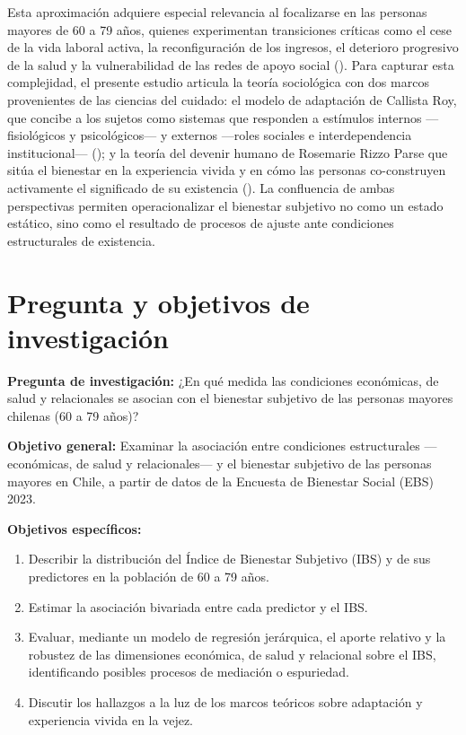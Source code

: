 \documentclass[
  spanish,
  a4paper,
  oneside]{scrbook}
\providecommand{\tightlist}{%
  \setlength{\itemsep}{0pt}\setlength{\parskip}{0pt}}
\begin{document}
Esta aproximación adquiere especial relevancia al focalizarse en las
personas mayores de 60 a 79 años, quienes experimentan transiciones
críticas como el cese de la vida laboral activa, la reconfiguración de
los ingresos, el deterioro progresivo de la salud y la vulnerabilidad de
las redes de apoyo social (). Para capturar esta complejidad, el presente estudio articula la
teoría sociológica con dos marcos provenientes de las ciencias del
cuidado: el modelo de adaptación de Callista Roy, que concibe a los
sujetos como sistemas que responden a estímulos internos ---fisiológicos
y psicológicos--- y externos ---roles sociales e interdependencia
institucional--- (); y
la teoría del devenir humano de Rosemarie Rizzo Parse que sitúa el
bienestar en la experiencia vivida y en cómo las personas co-construyen
activamente el significado de su existencia
(). La
confluencia de ambas perspectivas permiten operacionalizar el bienestar
subjetivo no como un estado estático, sino como el resultado de procesos
de ajuste ante condiciones estructurales de existencia.

\section{Pregunta y objetivos de
investigación}\label{pregunta-y-objetivos-de-investigaciuxf3n}

\textbf{Pregunta de investigación:} ¿En qué medida las condiciones
económicas, de salud y relacionales se asocian con el bienestar
subjetivo de las personas mayores chilenas (60 a 79 años)?

\textbf{Objetivo general:} Examinar la asociación entre condiciones
estructurales ---económicas, de salud y relacionales--- y el bienestar
subjetivo de las personas mayores en Chile, a partir de datos de la
Encuesta de Bienestar Social (EBS) 2023.

\textbf{Objetivos específicos:}

\begin{enumerate}
\def\labelenumi{\arabic{enumi}.}
\tightlist
\item
  Describir la distribución del Índice de Bienestar Subjetivo (IBS) y de
  sus predictores en la población de 60 a 79 años.
\item
  Estimar la asociación bivariada entre cada predictor y el IBS.
\item
  Evaluar, mediante un modelo de regresión jerárquica, el aporte
  relativo y la robustez de las dimensiones económica, de salud y
  relacional sobre el IBS, identificando posibles procesos de mediación
  o espuriedad.
\item
  Discutir los hallazgos a la luz de los marcos teóricos sobre
  adaptación y experiencia vivida en la vejez.
\end{enumerate}
\end{document}
